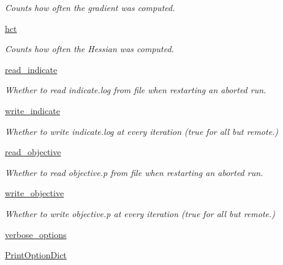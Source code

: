 \begin{DoxyCompactItemize}
\begin{DoxyCompactList}\small\item\em Counts how often the gradient was computed. \end{DoxyCompactList}\item 
\hyperlink{classforcebalance_1_1target_1_1Target_a5b5a42f78052b47f29ed4b940c6111a1}{hct}
\begin{DoxyCompactList}\small\item\em Counts how often the Hessian was computed. \end{DoxyCompactList}\item 
\hyperlink{classforcebalance_1_1target_1_1Target_aa8af57d5be669c4bb1c0cfd4b7a9220e}{read\-\_\-indicate}
\begin{DoxyCompactList}\small\item\em Whether to read indicate.\-log from file when restarting an aborted run. \end{DoxyCompactList}\item 
\hyperlink{classforcebalance_1_1target_1_1Target_a3a2f5d4bbb8d6ecb580eadb261977a57}{write\-\_\-indicate}
\begin{DoxyCompactList}\small\item\em Whether to write indicate.\-log at every iteration (true for all but remote.) \end{DoxyCompactList}\item 
\hyperlink{classforcebalance_1_1target_1_1Target_a22bdc4bbce2020ae44b44ad3e444fda6}{read\-\_\-objective}
\begin{DoxyCompactList}\small\item\em Whether to read objective.\-p from file when restarting an aborted run. \end{DoxyCompactList}\item 
\hyperlink{classforcebalance_1_1target_1_1Target_a7a95624dfe03f0cee0e5f1ae09db306a}{write\-\_\-objective}
\begin{DoxyCompactList}\small\item\em Whether to write objective.\-p at every iteration (true for all but remote.) \end{DoxyCompactList}\item 
\hyperlink{classforcebalance_1_1BaseClass_afd68efa29ccd2f320f4cf82198214aac}{verbose\-\_\-options}
\item 
\hyperlink{classforcebalance_1_1BaseClass_afc6659278497d7245bc492ecf405ccae}{Print\-Option\-Dict}
\end{DoxyCompactItemize}


